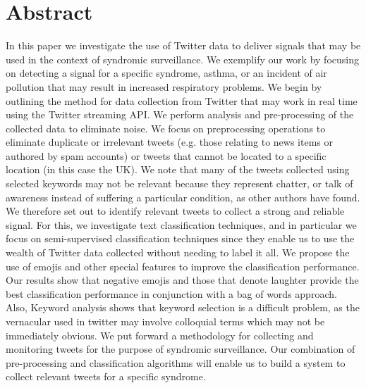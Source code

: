 \documentclass[10pt,letterpaper]{article}
\begin{document}
\section*{Abstract}
In this paper we investigate the use of Twitter data to deliver signals that may be used in the context of syndromic surveillance.  We exemplify our work by focusing on detecting a signal for a specific syndrome, asthma, or  an incident of air pollution that may result in increased respiratory problems.  We begin by outlining the method for data collection from Twitter that may work in real time using the Twitter streaming API.   We perform analysis  and pre-processing of the collected data to eliminate noise.  We focus on preprocessing operations to eliminate duplicate or irrelevant tweets (e.g. those relating to news items or authored by spam accounts) or  tweets that cannot be located to a specific location (in this case the UK).  We note that many of the tweets collected using selected keywords may not be relevant because they represent chatter, or talk of awareness instead of suffering a particular condition, as other authors have found.  We therefore set out to identify relevant tweets to collect a strong and reliable signal.  For this, we investigate text classification techniques, and in particular we focus on semi-supervised classification techniques since they enable us to use the wealth of Twitter data collected without needing to label it all.  We propose the use of emojis and  other special features to improve the classification performance.  Our results show that negative emojis and those that denote laughter provide the best classification performance in conjunction with a bag of words approach. 
Also, Keyword analysis shows that keyword selection is a difficult problem, as the vernacular used in twitter may involve colloquial terms which may not be immediately obvious. We put forward a methodology for collecting and monitoring tweets for the purpose of syndromic surveillance. Our combination of pre-processing and classification algorithms will enable us to build a system to collect relevant tweets for a specific syndrome.\\
\end{document}
